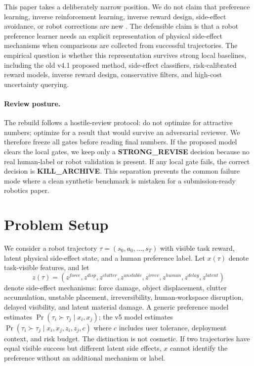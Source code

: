 \documentclass{article}
\begin{document}
This paper takes a deliberately narrow position. We do not claim that preference learning, inverse reinforcement learning, inverse reward design, side-effect avoidance, or robot corrections are new \citep{ng2000algorithms,abbeel2004apprenticeship,hadfieldmenell2017inverse,bajcsy2017learning,brown2019extrapolating}. The defensible claim is that a robot preference learner needs an explicit representation of physical side-effect mechanisms when comparisons are collected from successful trajectories. The empirical question is whether this representation survives strong local baselines, including the old v4.1 proposed method, side-effect classifiers, risk-calibrated reward models, inverse reward design, conservative filters, and high-cost uncertainty querying.

\paragraph{Review posture.}
The rebuild follows a hostile-review protocol: do not optimize for attractive numbers; optimize for a result that would survive an adversarial reviewer. We therefore freeze all gates before reading final numbers. If the proposed model clears the local gates, we keep only a \textbf{STRONG\_REVISE} decision because no real human-label or robot validation is present. If any local gate fails, the correct decision is \textbf{KILL\_ARCHIVE}. This separation prevents the common failure mode where a clean synthetic benchmark is mistaken for a submission-ready robotics paper.

\section{Problem Setup}
We consider a robot trajectory $\tau=(s_0,a_0,\ldots,s_T)$ with visible task reward, latent physical side-effect state, and a human preference label. Let $x(\tau)$ denote task-visible features, and let
\[
z(\tau)=\left(z^{force}, z^{disp}, z^{clutter}, z^{unstable}, z^{irrev}, z^{human}, z^{delay}, z^{latent}\right)
\]
denote side-effect mechanisms: force damage, object displacement, clutter accumulation, unstable placement, irreversibility, human-workspace disruption, delayed visibility, and latent material damage. A generic preference model estimates $\Pr(\tau_i \succ \tau_j \mid x_i,x_j)$; the v5 model estimates $\Pr(\tau_i \succ \tau_j \mid x_i,x_j,z_i,z_j,c)$ where $c$ includes user tolerance, deployment context, and risk budget. The distinction is not cosmetic. If two trajectories have equal visible success but different latent side effects, $x$ cannot identify the preference without an additional mechanism or label.
\end{document}
